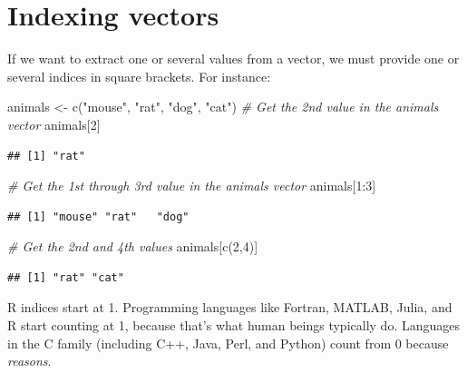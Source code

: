 \documentclass[
]{book}
\newenvironment{Shaded}{\begin{snugshade}}{\end{snugshade}}
\newcommand{\CommentTok}[1]{\textcolor[rgb]{0.56,0.35,0.01}{\textit{#1}}}
\newcommand{\DecValTok}[1]{\textcolor[rgb]{0.00,0.00,0.81}{#1}}
\newcommand{\FunctionTok}[1]{\textcolor[rgb]{0.00,0.00,0.00}{#1}}
\newcommand{\NormalTok}[1]{#1}
\newcommand{\OtherTok}[1]{\textcolor[rgb]{0.56,0.35,0.01}{#1}}
\newcommand{\SpecialCharTok}[1]{\textcolor[rgb]{0.00,0.00,0.00}{#1}}
\newcommand{\StringTok}[1]{\textcolor[rgb]{0.31,0.60,0.02}{#1}}
\begin{document}
\hypertarget{indexing-vectors}{%
\section{Indexing vectors}\label{indexing-vectors}}

If we want to extract one or several values from a vector, we must provide one or several indices in square brackets. For instance:

\begin{Shaded}
\begin{Highlighting}[]
\NormalTok{animals }\OtherTok{\textless{}{-}} \FunctionTok{c}\NormalTok{(}\StringTok{"mouse"}\NormalTok{, }\StringTok{"rat"}\NormalTok{, }\StringTok{"dog"}\NormalTok{, }\StringTok{"cat"}\NormalTok{)}
\CommentTok{\# Get the 2nd value in the animals vector}
\NormalTok{animals[}\DecValTok{2}\NormalTok{]}
\end{Highlighting}
\end{Shaded}

\begin{verbatim}
## [1] "rat"
\end{verbatim}

\begin{Shaded}
\begin{Highlighting}[]
\CommentTok{\# Get the 1st through 3rd value in the animals vector}
\NormalTok{animals[}\DecValTok{1}\SpecialCharTok{:}\DecValTok{3}\NormalTok{]}
\end{Highlighting}
\end{Shaded}

\begin{verbatim}
## [1] "mouse" "rat"   "dog"
\end{verbatim}

\begin{Shaded}
\begin{Highlighting}[]
\CommentTok{\# Get the 2nd and 4th values}
\NormalTok{animals[}\FunctionTok{c}\NormalTok{(}\DecValTok{2}\NormalTok{,}\DecValTok{4}\NormalTok{)]}
\end{Highlighting}
\end{Shaded}

\begin{verbatim}
## [1] "rat" "cat"
\end{verbatim}

R indices start at 1. Programming languages like Fortran, MATLAB, Julia, and R start counting at 1, because that's what human beings typically do. Languages in the C family (including C++, Java, Perl, and Python) count from 0 because \emph{reasons}.
\end{document}
